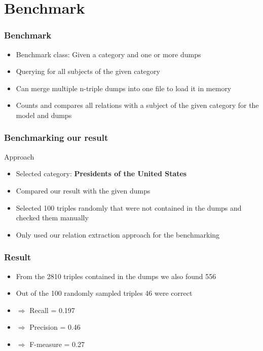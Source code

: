 \documentclass{beamer}
\begin{document}


\section{Benchmark}
\begin{frame}
\frametitle{Benchmark}
\begin{itemize}
	\item Benchmark class: Given a category and one or more dumps
	\item Querying for all subjects of the given category
	\item Can merge multiple n-triple dumps into one file to load it in memory
	\item Counts and compares all relations with a subject of the given category for the model and dumps
\end{itemize}
\end{frame}

\begin{frame}
\frametitle{Benchmarking our result}

\begin{block}{Approach}
	\begin{itemize}
		\item Selected category: \textbf{Presidents of the United States}
		\item Compared our result with the given dumps 
		\item Selected 100 triples randomly that were not contained in the dumps and checked them manually
		\item Only used our relation extraction approach for the benchmarking
	\end{itemize}
\end{block}

\end{frame}


\begin{frame}
\frametitle{Result}
\begin{itemize}
	\item From the 2810 triples contained in the dumps we also found 556 
	\item Out of the 100 randomly sampled triples 46 were correct
	\item[] $\Rightarrow$ Recall = 0.197
	\item[] $\Rightarrow$ Precision = 0.46
	\item[] $\Rightarrow$ F-measure = 0.27
\end{itemize}

\end{frame}
\end{document}
